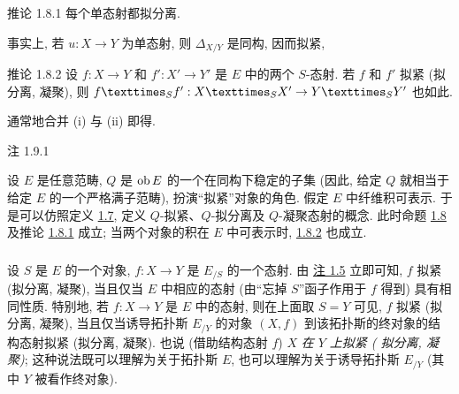 \begin{enonce*}{推论 1.8.1}
每个单态射都拟分离.
\end{enonce*}

事实上, 若 $u : X \to Y$ 为单态射,
则 $\Delta_{X/Y}$ 是同构, 因而拟紧, \cqfd

\begin{enonce*}{推论 1.8.2}
设 $f:X \to Y$ 和 $f':X' \to Y'$ 是 $E$ 中的两个 $S$-态射.
若 $f$ 和 $f'$ 拟紧 (\resp 拟分离, \resp 凝聚),
则 $\fprod{f}{f'}{S} : \fprod{X}{X'}{S} \to \fprod{Y}{Y'}{S}$ 也如此.
\end{enonce*}

通常地合并 (i) 与 (ii) 即得.

\begin{enonce*}{注 1.9.1}



设 $E$ 是任意范畴,
$Q$ 是 $\operatorname{ob} E$ 的一个在同构下稳定的子集
(因此, 给定 $Q$ 就相当于给定 $E$ 的一个严格满子范畴),
扮演“拟紧”对象的角色.
假定 $E$ 中纤维积可表示.
于是可以仿照定义 \hyperref[VI.def1.7]{1.7},
定义 $Q$-拟紧、$Q$-拟分离及 $Q$-凝聚态射的概念.
此时命题 \hyperref[VI.prop1.8]{1.8}
及推论 \hyperref[VI.cor1.8.1]{1.8.1} 成立;
当两个对象的积在 $E$ 中可表示时,
\hyperref[VI.cor1.8.2]{1.8.2} 也成立.
\end{enonce*}

\setcounter{subsection}{9}
\setcounter{subsubsection}{1}
\subsubsection{}
设 $S$ 是 $E$ 的一个对象,
$f:X\to Y$ 是 $E_{/S}$ 的一个态射.
由 \hyperref[VI.rem1.5.1]{注 1.5} 立即可知,
$f$ 拟紧 (\resp 拟分离, \resp 凝聚),
当且仅当 $E$ 中相应的态射\pageoriginale{}
(由“忘掉 $S$”函子作用于 $f$ 得到) 具有相同性质.
特别地, 若 $f:X\to Y$ 是 $E$ 中的态射,
则在上面取 $S=Y$ 可见,
$f$ 拟紧 (\resp 拟分离, \resp 凝聚),
当且仅当诱导拓扑斯 $E_{/Y}$ 的对象 $(X,f)$
到该拓扑斯的终对象的结构态射拟紧 (\resp 拟分离, \resp 凝聚).
也说 (借助结构态射 $f$)
$X$ \emph{在 $Y$ 上拟紧 (\emph{\resp} 拟分离, \emph{\resp} 凝聚)};
这种说法既可以理解为关于拓扑斯 $E$,
也可以理解为关于诱导拓扑斯 $E_{/Y}$
(其中 $Y$ 被看作终对象).


